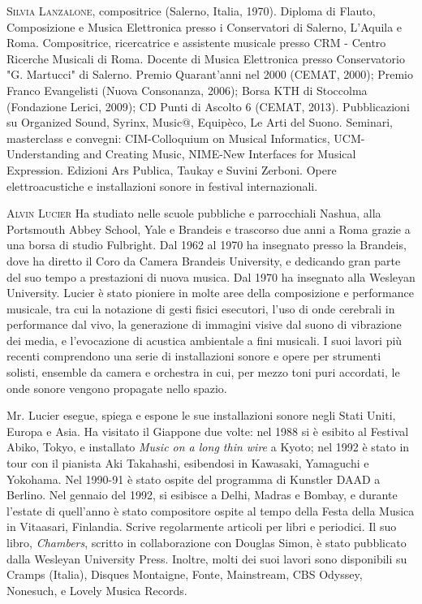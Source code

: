 \documentclass[9pt, twoside, a5paper]{extreport}
\newcommand{\biografia}[2]{%
\noindent \textsc{#1} %
#2 %
\medskip
}%
\begin{document}
\begin{multicols}{2}

\biografia{Silvia Lanzalone,}{compositrice (Salerno, Italia, 1970). Diploma di Flauto, Composizione e Musica Elettronica presso i Conservatori di Salerno, L’Aquila e Roma. Compositrice, ricercatrice e assistente musicale presso CRM - Centro Ricerche Musicali di Roma. Docente di Musica Elettronica presso Conservatorio "G. Martucci" di Salerno. Premio Quarant’anni nel 2000 (CEMAT, 2000); Premio Franco Evangelisti (Nuova Consonanza, 2006); Borsa KTH di Stoccolma (Fondazione Lerici, 2009); CD Punti di Ascolto 6 (CEMAT, 2013). Pubblicazioni su Organized Sound, Syrinx, Music@, Equipèco, Le Arti del Suono. Seminari, masterclass e convegni: CIM-Colloquium on Musical Informatics, UCM-Understanding and Creating Music, NIME-New Interfaces for Musical Expression. Edizioni Ars Publica, Taukay e Suvini Zerboni. Opere elettroacustiche e installazioni sonore in festival internazionali.}

\biografia{Alvin Lucier}{Ha studiato nelle scuole pubbliche e parrocchiali Nashua, alla Portsmouth Abbey School, Yale e Brandeis e trascorso due anni a Roma grazie a una borsa di studio Fulbright. Dal 1962 al 1970 ha insegnato presso la Brandeis, dove ha diretto il Coro da Camera Brandeis University, e dedicando gran parte del suo tempo a prestazioni di nuova musica. Dal 1970 ha insegnato alla Wesleyan University. Lucier è stato pioniere in molte aree della composizione e performance musicale, tra cui la notazione di gesti fisici esecutori, l'uso di onde cerebrali in performance dal vivo, la generazione di immagini visive dal suono di vibrazione dei media, e l'evocazione di acustica ambientale a fini musicali. I suoi lavori più recenti comprendono una serie di installazioni sonore e opere per strumenti solisti, ensemble da camera e orchestra in cui, per mezzo toni puri accordati, le onde sonore vengono propagate nello spazio.

Mr. Lucier esegue, spiega e espone le sue installazioni sonore negli Stati Uniti, Europa e Asia. Ha visitato il Giappone due volte: nel 1988 si è esibito al Festival Abiko, Tokyo, e installato \textit{Music on a long thin wire} a Kyoto; nel 1992 è stato in tour con il pianista Aki Takahashi, esibendosi in Kawasaki, Yamaguchi e Yokohama. Nel 1990-91 è stato ospite del programma di Kunstler DAAD a Berlino. Nel gennaio del 1992, si esibisce a Delhi, Madras e Bombay, e durante l'estate di quell'anno è stato compositore ospite al tempo della Festa della Musica in Vitaasari, Finlandia. Scrive regolarmente articoli per libri e periodici. Il suo libro, \textit{Chambers}, scritto in collaborazione con Douglas Simon, è stato pubblicato dalla Wesleyan University Press. Inoltre, molti dei suoi lavori sono disponibili su Cramps (Italia), Disques Montaigne, Fonte, Mainstream, CBS Odyssey, Nonesuch, e Lovely Musica Records.

}
\end{multicols}
\end{document}

